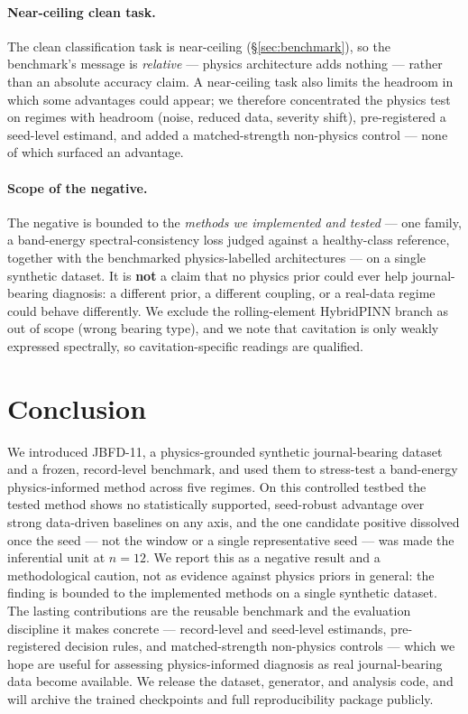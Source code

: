 \documentclass{article}
\begin{document}
\paragraph{Near-ceiling clean task.}
The clean classification task is near-ceiling (\S\ref{sec:benchmark}), so the
benchmark's message is \emph{relative} --- physics architecture adds nothing ---
rather than an absolute accuracy claim. A near-ceiling task also limits the
headroom in which some advantages could appear; we therefore concentrated the
physics test on regimes with headroom (noise, reduced data, severity shift),
pre-registered a seed-level estimand, and added a matched-strength non-physics
control --- none of which surfaced an advantage.

\paragraph{Scope of the negative.}
The negative is bounded to the \emph{methods we implemented and tested} --- one
family, a band-energy spectral-consistency loss judged against a healthy-class
reference, together with the benchmarked physics-labelled architectures --- on a
single synthetic dataset. It is \textbf{not} a claim that no physics prior could
ever help journal-bearing diagnosis: a different prior, a different coupling, or
a real-data regime could behave differently. We exclude the rolling-element
HybridPINN branch as out of scope (wrong bearing type), and we note that
cavitation is only weakly expressed spectrally, so cavitation-specific readings
are qualified.

\section{Conclusion}
\label{sec:conclusion}
We introduced JBFD-11, a physics-grounded synthetic journal-bearing dataset and
a frozen, record-level benchmark, and used them to stress-test a band-energy
physics-informed method across five regimes. On this controlled testbed the
tested method shows no statistically supported, seed-robust advantage over strong
data-driven baselines on any axis, and the one candidate positive dissolved once
the seed --- not the window or a single representative seed --- was made the
inferential unit at $n{=}12$. We report this as a negative result and a
methodological caution, not as evidence against physics priors in general: the
finding is bounded to the implemented methods on a single synthetic dataset. The
lasting contributions are the reusable benchmark and the evaluation discipline it
makes concrete --- record-level and seed-level estimands, pre-registered decision
rules, and matched-strength non-physics controls --- which we hope are useful for
assessing physics-informed diagnosis as real journal-bearing data become
available. We release the dataset, generator, and analysis code, and will archive
the trained checkpoints and full reproducibility package publicly.
\end{document}

